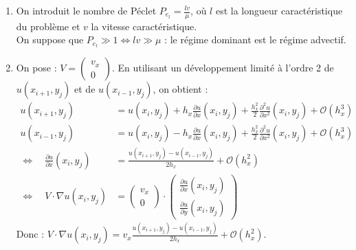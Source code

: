 \documentclass[12pt,a4paper]{article}
\begin{document}
\begin{enumerate}[resume]
    \item On introduit le nombre de Péclet $P_{e_l} = \frac{lv}{\mu}$, où $l$ est la longueur caractéristique du problème et $v$ la vitesse caractéristique. \\
    On suppose que $P_{e_l} \gg 1 \Leftrightarrow lv \gg \mu$ : le régime dominant est le régime advectif. \\

    \item On pose : $V = \begin{pmatrix}
        v_x \\
        0
        \end{pmatrix}$.
        En utilisant un développement limité à l'ordre 2 de $u(x_{i+1}, y_j)$ et de $u(x_{i-1}, y_j)$, on obtient :
        \begin{align*}
            u(x_{i+1}, y_j) &= u(x_i, y_j) + h_x \frac{\partial u}{\partial x}(x_i, y_j) + \frac{h_x^2}{2} \frac{\partial^2 u}{\partial x^2}(x_i, y_j) + \mathcal{O}(h_x^3) \\
            u(x_{i-1}, y_j) &= u(x_i, y_j) - h_x \frac{\partial u}{\partial x}(x_i, y_j) + \frac{h_x^2}{2} \frac{\partial^2 u}{\partial x^2}(x_i, y_j) + \mathcal{O}(h_x^3) \\
            \Leftrightarrow \quad \frac{\partial u}{\partial x}(x_i, y_j) &= \frac{u(x_{i+1}, y_j) - u(x_{i-1}, y_j)}{2h_x} + \mathcal{O}(h_x^2)\\
            \Leftrightarrow \quad V \cdot \nabla u(x_i, y_j) &= \begin{pmatrix}
                v_x \\
                0
            \end{pmatrix} \cdot
            \begin{pmatrix}
                \frac{\partial u}{\partial x}(x_i, y_j) \\
                \frac{\partial u}{\partial y}(x_i, y_j)
            \end{pmatrix}
        \end{align*}
        Donc : $V \cdot \nabla u(x_i, y_j) = v_x \frac{u(x_{i+1}, y_j) - u(x_{i-1}, y_j)}{2h_x} + \mathcal{O}(h_x^2)$.


\end{enumerate}
\end{document}
